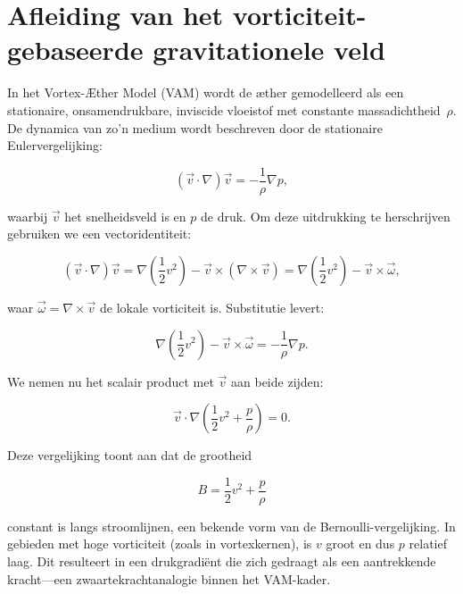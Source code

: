 
\section{Afleiding van het vorticiteit-gebaseerde gravitationele veld}

In het Vortex-Æther Model (VAM) wordt de æther gemodelleerd als een stationaire, onsamendrukbare, inviscide vloeistof met constante massadichtheid~$\rho$. De dynamica van zo'n medium wordt beschreven door de stationaire Eulervergelijking:

\begin{equation}
(\vec{v} \cdot \nabla)\vec{v} = -\frac{1}{\rho} \nabla p,
\end{equation}

waarbij $\vec{v}$ het snelheidsveld is en $p$ de druk. Om deze uitdrukking te herschrijven gebruiken we een vectoridentiteit:

\begin{equation}
(\vec{v} \cdot \nabla)\vec{v} = \nabla\left(\frac{1}{2}v^2\right) - \vec{v} \times (\nabla \times \vec{v}) = \nabla\left(\frac{1}{2}v^2\right) - \vec{v} \times \vec{\omega},
\end{equation}

waar $\vec{\omega} = \nabla \times \vec{v}$ de lokale vorticiteit is. Substitutie levert:

\begin{equation}
\nabla\left(\frac{1}{2}v^2\right) - \vec{v} \times \vec{\omega} = -\frac{1}{\rho} \nabla p.
\end{equation}

We nemen nu het scalair product met $\vec{v}$ aan beide zijden:

\begin{equation}
\vec{v} \cdot \nabla\left(\frac{1}{2}v^2 + \frac{p}{\rho}\right) = 0.
\end{equation}

Deze vergelijking toont aan dat de grootheid

\begin{equation}
B = \frac{1}{2}v^2 + \frac{p}{\rho}
\end{equation}

constant is langs stroomlijnen, een bekende vorm van de Bernoulli-vergelijking. In gebieden met hoge vorticiteit (zoals in vortexkernen), is $v$ groot en dus $p$ relatief laag. Dit resulteert in een drukgradiënt die zich gedraagt als een aantrekkende kracht—een zwaartekrachtanalogie binnen het VAM-kader.

